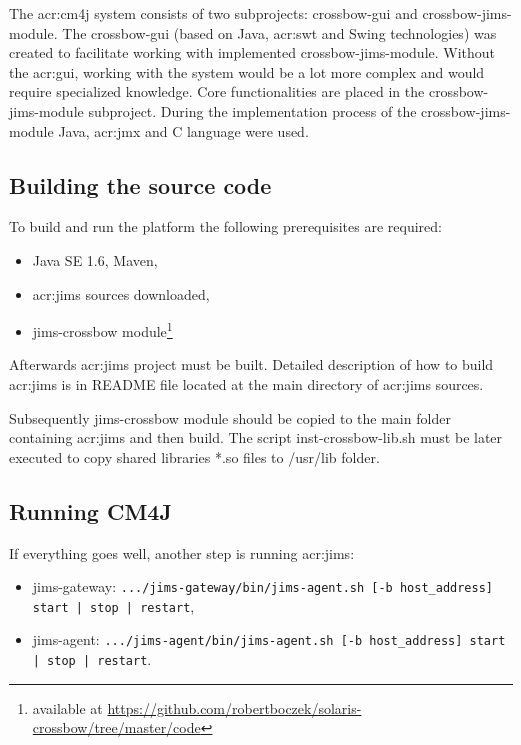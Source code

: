 \documentclass[11pt,openany]{book}
\begin{document}
        The \gls{acr:cm4j} system consists of two subprojects: crossbow-gui and crossbow-jims-module. The crossbow-gui
        (based on Java, \gls{acr:swt} and Swing technologies) was created to facilitate working with implemented
        crossbow-jims-module. Without the \gls{acr:gui}, working with the system would be a lot more complex and would
        require specialized knowledge. Core functionalities are placed in the crossbow-jims-module subproject. During
        the implementation process of the crossbow-jims-module Java, \gls{acr:jmx} and C language were used.


      \subsection{Building the source code}

        To build and run the platform the following prerequisites are required:

        \begin{itemize}
          \item Java SE 1.6, Maven,
          \item \gls{acr:jims} sources downloaded,
          \item jims-crossbow module\footnote{available at \url{https://github.com/robertboczek/solaris-crossbow/tree/master/code}}
        \end{itemize}

        Afterwards \gls{acr:jims} project must be built. Detailed description of how to build \gls{acr:jims} is in
        README file located at the main directory of \gls{acr:jims} sources.

        Subsequently jims-crossbow module should be copied to the main folder containing \gls{acr:jims} and then build.
        The script inst-crossbow-lib.sh must be later executed to copy shared libraries *.so files to /usr/lib folder.


      \subsection{Running CM4J}

        If everything goes well, another step is running \gls{acr:jims}:

        \begin{itemize}
          \item jims-gateway: \texttt{.../jims-gateway/bin/jims-agent.sh [-b host\_address] start | stop | restart},
          \item jims-agent: \texttt{.../jims-agent/bin/jims-agent.sh [-b host\_address] start | stop | restart}.
        \end{itemize}
\end{document}

